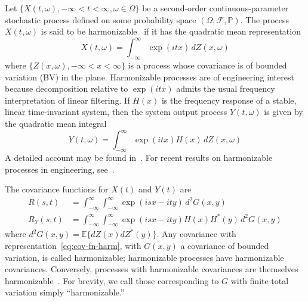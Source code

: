 \documentclass[11pt]{article}
\theoremstyle{plain}
\theoremstyle{definition}
\theoremstyle{remark}
\begin{document}
Let $\{X(t,\omega), -\infty < t < \infty, \omega \in \Omega\}$ be a second-order continuous-parameter stochastic process defined on some probability space $(\Omega, \mathcal{F}, \mathbb{P})$. The process $X(t,\omega)$ is said to be harmonizable~\cite[p.~474]{loeve1955probability} if it has the quadratic mean representation
\begin{equation}
X(t,\omega) = \int_{-\infty}^{\infty} \exp(itx) \, dZ(x,\omega)
\label{eq:process-harmonizable}
\end{equation}
where $\{Z(x,\omega), -\infty < x < \infty\}$ is a process whose covariance is of bounded variation (BV) in the plane. Harmonizable processes are of engineering interest because decomposition relative to $\exp(itx)$ admits the usual frequency interpretation of linear filtering. If $H(x)$ is the frequency response of a stable, linear time-invariant system, then the system output process $Y(t,\omega)$ is given by the quadratic mean integral
\begin{equation}
Y(t,\omega) = \int_{-\infty}^{\infty} \exp(itx) H(x) \, dZ(x,\omega)
\label{eq:lti-filter}
\end{equation}
A detailed account may be found in~\cite[Ch.~8]{blanc-lapierre1968random}. For recent results on harmonizable processes in engineering, see~\cite{cambanis1970harmonizable,donati1971spectra,ogura1971spectral}.

The covariance functions for $X(t)$ and $Y(t)$ are
\begin{align}
R(s,t) &= \int_{-\infty}^{\infty} \int_{-\infty}^{\infty} \exp(isx - ity)\, d^2G(x,y) \label{eq:cov-fn-harm} \\
R_Y(s,t) &= \int_{-\infty}^{\infty} \int_{-\infty}^{\infty} \exp(isx - ity) H(x)H^*(y)\, d^2G(x,y) \label{eq:cov-fn-filtered}
\end{align}
where $d^2G(x,y) = \mathbb{E}\{dZ(x) dZ^*(y)\}$. Any covariance with representation~\eqref{eq:cov-fn-harm}, with $G(x,y)$ a covariance of bounded variation, is called harmonizable; harmonizable processes have harmonizable covariances. Conversely, processes with harmonizable covariances are themselves harmonizable~\cite[p.~476]{loeve1955probability}. For brevity, we call those corresponding to $G$ with finite total variation simply ``harmonizable.''
\end{document}
